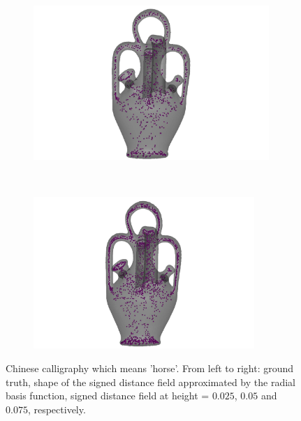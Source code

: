 \documentclass[annual]{acmsiggraph}
\begin{document}
\begin{figure}
\begin{subfigure}[b]{0.24\linewidth}
        \end{subfigure}
~
		\begin{subfigure}[b]{0.24\linewidth}
                \centering
                \includegraphics[width=0.98\textwidth]{images/vase/3.pdf}
        \end{subfigure}
~
		\begin{subfigure}[b]{0.24\linewidth}
                \centering
                \includegraphics[width=0.92\textwidth]{images/vase/4.pdf}
        \end{subfigure}
        \caption{Chinese calligraphy which means 'horse'. From left to right: ground truth, shape of the signed distance field approximated by the radial basis function, signed distance field at height = $0.025$, $0.05$ and $0.075$, respectively. }
				\label{fig:horse}
\end{figure}
\end{document}
